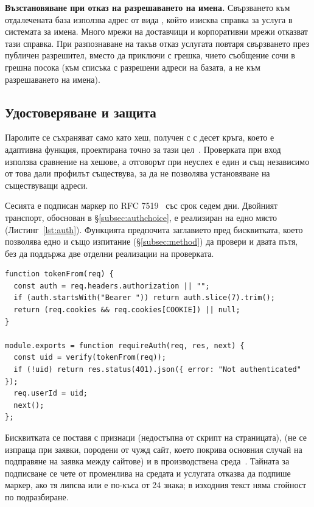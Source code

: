 \textbf{Възстановяване при отказ на разрешаването на имена.} Свързването към
отдалечената база използва адрес от вида , който изисква справка
за услуга в системата за имена. Много мрежи на доставчици и корпоративни мрежи
отказват тази справка. При разпознаване на такъв отказ услугата повтаря свързването
през публичен разрешител, вместо да приключи с грешка, чието съобщение сочи в грешна
посока (към списъка с разрешени адреси на базата, а не към разрешаването на имена).

\subsection{Удостоверяване и защита}
\label{subsec:security}

Паролите се съхраняват само като хеш, получен с  с десет кръга,
което е адаптивна функция, проектирана точно за тази цел~\cite{provos1999bcrypt}.
Проверката при вход използва сравнение на хешове, а отговорът при неуспех е един и
същ независимо от това дали профилът съществува, за да не позволява установяване на
съществуващи адреси.

Сесията е подписан маркер по RFC 7519~\cite{rfc7519} със срок седем дни. Двойният
транспорт, обоснован в §\ref{subsec:authchoice}, е реализиран на едно място
(Листинг~\ref{lst:auth}). Функцията предпочита заглавието пред бисквитката, което
позволява едно и също изпитание (§\ref{subsec:method}) да провери и двата пътя, без
да поддържа две отделни реализации на проверката.

\begin{lstlisting}[caption={Приемане на маркера от заглавие или от бисквитка},label={lst:auth}]
function tokenFrom(req) {
  const auth = req.headers.authorization || "";
  if (auth.startsWith("Bearer ")) return auth.slice(7).trim();
  return (req.cookies && req.cookies[COOKIE]) || null;
}

module.exports = function requireAuth(req, res, next) {
  const uid = verify(tokenFrom(req));
  if (!uid) return res.status(401).json({ error: "Not authenticated" });
  req.userId = uid;
  next();
};
\end{lstlisting}

Бисквитката се поставя с признаци  (недостъпна от скрипт на
страницата),  (не се изпраща при заявки, породени от чужд сайт,
което покрива основния случай на подправяне на заявка между сайтове) и 
в производствена среда~\cite{rfc6265}. Тайната за подписване се чете от променлива на
средата и услугата отказва да подпише маркер, ако тя липсва или е по-къса от 24 знака;
в изходния текст няма стойност по подразбиране.

